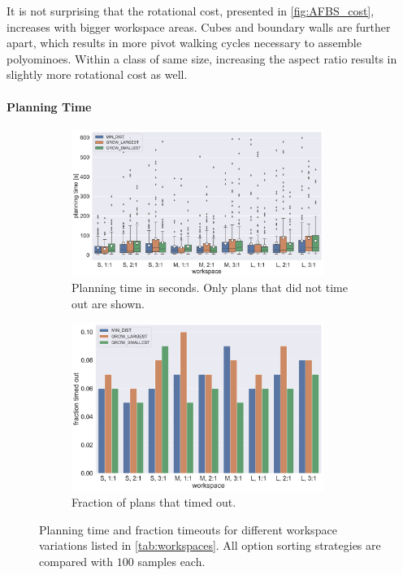 It is not surprising that the rotational cost, presented in \autoref{fig:AFBS_cost}, increases with bigger workspace areas.
Cubes and boundary walls are further apart, which results in more pivot walking cycles necessary to assemble polyominoes.
Within a class of same size, increasing the aspect ratio results in slightly more rotational cost as well.

\paragraph{Planning Time} 

\begin{figure}
	\centering
	\begin{subfigure}[b]{\textwidth}
		\centering
		\includegraphics[width=0.9\textwidth]{figures/plots/AFBS_time.pdf}
		\caption{Planning time in seconds. Only plans that did not time out are shown.}
		\label{fig:AFBS_time}
	\end{subfigure}
	
	\begin{subfigure}[b]{\textwidth}
		\centering
		\includegraphics[width=0.9\textwidth]{figures/plots/AFBS_timeout.pdf}
		\caption{Fraction of plans that timed out.}
		\label{fig:AFBS_timeout}
	\end{subfigure}
	\caption[Planning time and fraction of timeouts for workspace variations]{Planning time and fraction timeouts for different workspace variations listed in \autoref{tab:workspaces}. All option sorting strategies are compared with $100$ samples each.}
	\label{fig:AFBS_timestats}
\end{figure}

